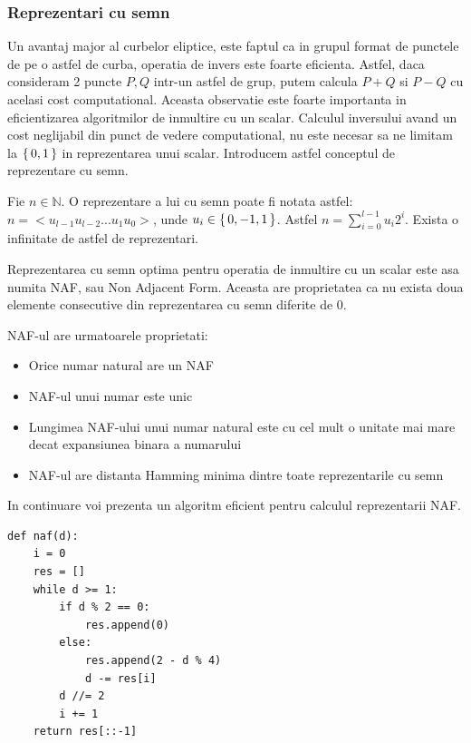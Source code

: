 \subsubsection{Reprezentari cu semn}

Un avantaj major al curbelor eliptice, este faptul ca in grupul format de punctele de pe o astfel de curba, operatia de invers este foarte eficienta. Astfel, daca consideram 2 puncte $P, Q$ intr-un astfel de grup, putem calcula $P + Q$ si $P - Q$ cu acelasi cost computational. Aceasta observatie este foarte importanta in eficientizarea algoritmilor de inmultire cu un scalar. Calculul inversului avand un cost neglijabil din punct de vedere computational, nu este necesar sa ne limitam la $\set{0, 1}$ in reprezentarea unui scalar. Introducem astfel conceptul de reprezentare cu semn.

\begin{dfn}
 Fie $n\in\mathbb{N}$. O reprezentare a lui cu semn poate fi notata astfel: $n = <u_{l-1}u_{l-2}...u_1u_0>$, unde $u_i\in\set{0, -1, 1}$. Astfel $n = \sum_{i=0}^{l-1} u_i 2^{i}$. Exista o infinitate de astfel de reprezentari.
\end{dfn}
\begin{dfn}
Reprezentarea cu semn optima pentru operatia de inmultire cu un scalar este asa numita NAF, sau Non Adjacent Form. Aceasta are proprietatea ca nu exista doua elemente consecutive din reprezentarea cu semn diferite de 0.
\end{dfn}

\begin{teo}
NAF-ul are urmatoarele proprietati:
\begin{itemize}
  \item Orice numar natural are un NAF
  \item NAF-ul unui numar este unic
  \item Lungimea NAF-ului unui numar natural este cu cel mult o unitate mai mare decat expansiunea binara a numarului 
  \item NAF-ul are distanta Hamming minima dintre toate reprezentarile cu semn
\end{itemize}
\end{teo}

In continuare voi prezenta un algoritm eficient pentru calculul reprezentarii NAF.

\begin{lstlisting}
def naf(d):
    i = 0
    res = []
    while d >= 1:
        if d % 2 == 0:
            res.append(0)
        else:
            res.append(2 - d % 4)
            d -= res[i]
        d //= 2
        i += 1
    return res[::-1]
\end{lstlisting}

